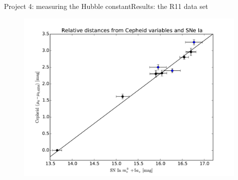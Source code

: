 \documentclass{beamer}
\begin{document}
\begin{frame}{Project 4: measuring the Hubble constant}{Results: the R11 data set}
{\begin{figure}
\includegraphics[scale=0.4]{../figures/chapter-h0/effective_HP_SNIa.pdf} 
\end{figure}}



\end{frame}
\end{document}
